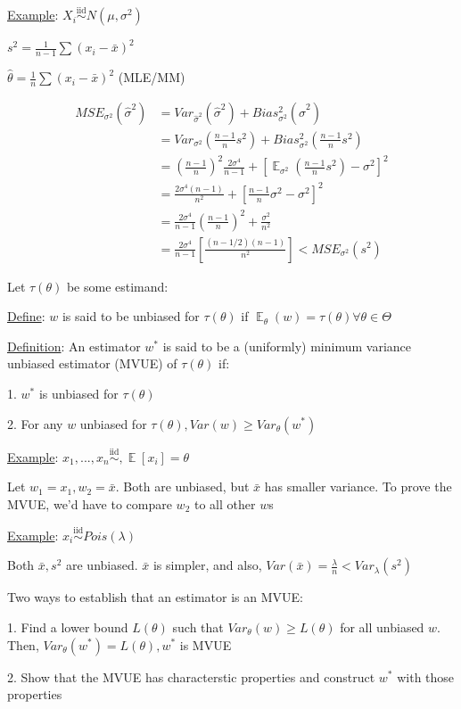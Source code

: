 \documentclass{article}
\DeclareMathOperator{\EX}{\mathbb{E}} %
\let\Oldsum=\sum
\renewcommand{\sum}{\Oldsum\limits}
\newcommand{\iiddist}{\overset{\mathrm{iid}}{\sim}}
\begin{document}
\underline{Example}: $X_i \iiddist N(\mu, \sigma^2)$

$s^2 = \frac{1}{n-1}\sum(x_i - \bar{x})^2$

$\hat{\theta} = \frac{1}{n}\sum(x_i - \bar{x})^2$ (MLE/MM)


$$
\begin{aligned}
MSE_{\sigma^2}(\hat{\sigma}^2) 
&= Var_{\hat{\sigma}^2}(\hat{\sigma}^2) + Bias^2_{\sigma^2}(\hat{\sigma}^2) \\
&= Var_{\sigma^2}(\frac{n-1}{n}s^2) + Bias^2_{\sigma^2}(\frac{n-1}{n}s^2) \\
&= (\frac{n-1}{n})^2\frac{2\sigma^4}{n-1} + [\EX_{\sigma^2}(\frac{n-1}{n}s^2) - \sigma^2]^2 \\
&= \frac{2\sigma^4(n-1)}{n^2} + [\frac{n-1}{n}\sigma^2 - \sigma^2]^2 \\
&= \frac{2\sigma^4}{n-1}(\frac{n-1}{n})^2 + \frac{\sigma^2}{n^2} \\
&= \frac{2\sigma^4}{n-1}[\frac{(n-1/2)(n-1)}{n^2}] < MSE_{\sigma^2}(s^2)
\end{aligned}
$$


Let $\tau(\theta)$ be some estimand:

\underline{Define}: $w$ is said to be unbiased for $\tau(\theta)$ if $\EX_{\theta}(w) = \tau(\theta) \forall \theta \in \Theta$

\underline{Definition}: An estimator $w^*$ is said to be a (uniformly) minimum variance unbiased estimator (MVUE) of $\tau(\theta)$ if:

1. $w^*$ is unbiased for $\tau(\theta)$

2. For any $w$ unbiased for $\tau(\theta), Var(w) \ge Var_{\theta}(w^*)$

\underline{Example}: $x_1, ..., x_n \iiddist, \EX[x_i] = \theta$

Let $w_1 = x_1, w_2 = \bar{x}$. Both are unbiased, but $\bar{x}$ has smaller variance. To prove the MVUE, we'd have to compare $w_2$ to all other $w$s

\underline{Example}: $x_i \iiddist Pois(\lambda)$

Both $\bar{x}, s^2$ are unbiased. $\bar{x}$ is simpler, and also, $Var(\bar{x}) = \frac{\lambda}{n} < Var_{\lambda}(s^2)$


Two ways to establish that an estimator is an MVUE:

1. Find a lower bound $L(\theta)$ such that $Var_{\theta}(w) \ge L(\theta)$ for all unbiased $w$. Then, $Var_{\theta}(w^*) = L(\theta), w^*$ is MVUE

2. Show that the MVUE has characterstic properties and construct $w^*$ with those properties
\end{document}
